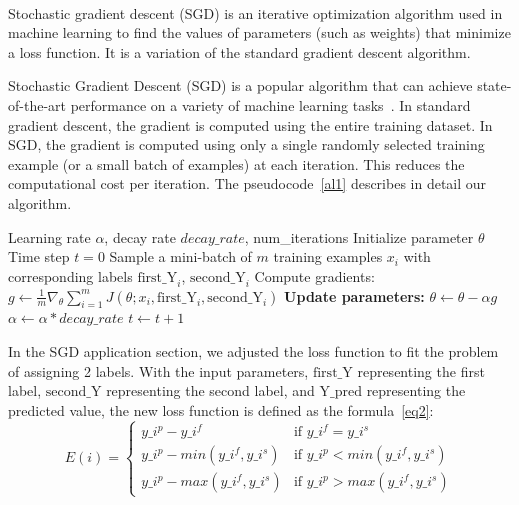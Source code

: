 \documentclass[../ICIT-Paper-2024.tex]{subfiles}
\begin{document}
\paragraph{}
Stochastic gradient descent (SGD) is an iterative optimization algorithm used in machine learning to find the values of parameters (such as weights) that minimize a loss function. It is a variation of the standard gradient descent algorithm.

Stochastic Gradient Descent (SGD) is a popular algorithm that can achieve state-of-the-art performance on a variety of machine learning tasks~\cite{recht2011hogwild}. In standard gradient descent, the gradient is computed using the entire training dataset. In SGD, the gradient is computed using only a single randomly selected training example (or a small batch of examples) at each iteration. This reduces the computational cost per iteration. The pseudocode~\ref{al1} describes in detail our algorithm.
\begin{algorithm}[H]
\caption{Stochastic Gradient Descent Algorithm Implementation}\label{al1}
\label{alg:example}
\begin{algorithmic}[1]
\Require Learning rate $\alpha$, decay rate $decay\_rate$, num\_iterations
\State Initialize parameter $\theta$
\State Time step $t = 0$
    \State Sample a mini-batch of $m$ training examples $x_i$ with corresponding labels $\mathrm{first\_Y}_i$, $\mathrm{second\_Y}_i$
    \State Compute gradients: $g \leftarrow \frac{1}{m} \nabla_\theta \sum_{i=1}^m J(\theta; x_i, \mathrm{first\_Y}_i, \mathrm{second\_Y}_i)$
    \State \textbf{Update parameters:} $\theta \leftarrow \theta - \alpha g$
    \State $\alpha \leftarrow \alpha * decay\_rate$
    \State $t \leftarrow t + 1$
\EndFor
\end{algorithmic}
\end{algorithm}


In the SGD application section, we adjusted the loss function to fit the problem of assigning 2 labels. With the input parameters, $\mathrm{first\_Y}$ representing the first label, $\mathrm{second\_Y}$ representing the second label, and $\mathrm{Y\_pred}$ representing the predicted value, the new loss function is defined as the formula~\ref{eq2}:
\begin{equation}\label{eq2}
E(i) = \left\{
\begin{array}{ll}
y\_i^p - y\_i^f & \text{if } y\_i^f = y\_i^s \\
y\_i^p - min(y\_i^f, y\_i^s) & \text{if } y\_i^p < min(y\_i^f, y\_i^s) \\
y\_i^p - max(y\_i^f, y\_i^s) & \text{if } y\_i^p > max(y\_i^f, y\_i^s)
\end{array}
\right.
\end{equation}
\end{document}
